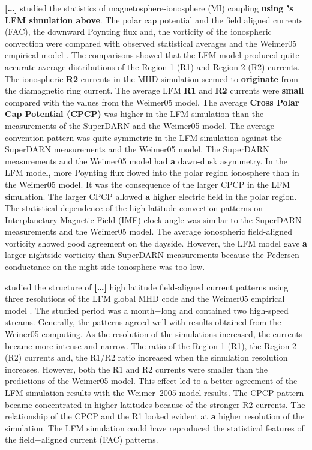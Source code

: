 \documentclass[linenumbers,draft]{agujournal}
\begin{document}
\citet{zhang11:_lyon_fedder_mobar_mhd} \textbf{[\dots]} studied the statistics of magnetosphere-ionosphere (MI) coupling \textbf{using \citet{guild08:_geotail_lfm1}'s LFM simulation above}. The polar cap potential and the field aligned currents (FAC), the downward Poynting flux and, the vorticity of the ionospheric convection were compared with observed statistical averages and the Weimer05 empirical model \citep{weimer05:_improv_joule}. The comparisons showed that the LFM model produced quite accurate average distributions of the Region 1 (R1) and Region 2 (R2) currents. The ionospheric \textbf{R2} currents in the MHD simulation seemed to \textbf{originate} from the diamagnetic ring current. The average LFM \textbf{R1} and \textbf{R2} currents were \textbf{small} compared with the values from the Weimer05 model. The average \textbf{Cross Polar Cap Potential (CPCP)} was higher in the LFM simulation than the measurements of the SuperDARN and the Weimer05 model. The average convention pattern was quite symmetric in the LFM simulation against the SuperDARN measurements and the Weimer05 model. The SuperDARN measurements and the Weimer05 model had \textbf{a} dawn-dusk asymmetry. In the LFM model\textbf{,} more Poynting flux flowed into the polar region ionosphere than in the Weimer05 model. It was the consequence of the larger CPCP in the LFM simulation. The larger CPCP allowed \textbf{a} higher electric field in the polar region. The statistical dependence of the high-latitude convection patterns on Interplanetary Magnetic Field (IMF) clock angle was similar to the SuperDARN measurements \citep{sofko95:_direc_super} and the Weimer05 model. The average ionospheric field-aligned vorticity showed good agreement on the dayside. However, the LFM model gave \textbf{a} larger nightside vorticity than SuperDARN measurements because the Pedersen conductance on the night side ionosphere was too low. 

\citet{wiltberger17:_struc_high_latit_curren_magnet_ionos_model} studied the structure of \textbf{[\dots]} high latitude field-aligned current patterns using three resolutions of the LFM global MHD code and the Weimer05 empirical model \citep{weimer05:_improv_joule}. The studied period was a month$-$long and contained two high-speed streams. Generally, the patterns agreed well with results obtained from the Weiner05 computing. As the resolution of the simulations increased, the currents became more intense and narrow. The ratio of the Region 1 (R1), the Region 2 (R2) currents and, the R1/R2 ratio increased when the simulation resolution increases. However, both the R1 and R2 currents were smaller than the predictions of the Weimer05 model. This effect led to a better agreement of the LFM simulation results with the Weimer~2005 model results. The CPCP pattern became concentrated in higher latitudes because of the stronger R2 currents. The relationship of the CPCP and the R1 looked evident at \textbf{a} higher resolution of the simulation. The LFM simulation could have reproduced the statistical features of the field$-$aligned current (FAC) patterns. 
\end{document}
